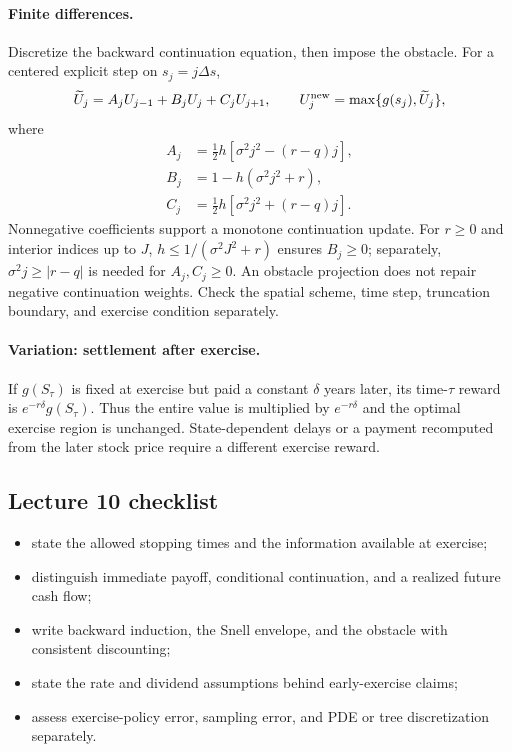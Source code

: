 \paragraph{Finite differences.}
Discretize the backward continuation equation, then impose the obstacle.
For a centered explicit step on \(s_j=j\Delta s\),
\[
\widetilde U_j=A_jU_{j-1}+B_jU_j+C_jU_{j+1},\qquad
U_j^{\rm new}=\max\{g(s_j),\widetilde U_j\},
\]
where
\[
\begin{aligned}
A_j&=\tfrac12h[\sigma^2j^2-(r-q)j],\\
B_j&=1-h(\sigma^2j^2+r),\\
C_j&=\tfrac12h[\sigma^2j^2+(r-q)j].
\end{aligned}
\]
Nonnegative coefficients support a monotone continuation update. For
\(r\geq0\) and interior indices up to \(J\),
\(h\leq1/(\sigma^2J^2+r)\) ensures \(B_j\geq0\); separately,
\(\sigma^2j\geq|r-q|\) is needed for \(A_j,C_j\geq0\).
An obstacle projection does not repair negative continuation weights.
Check the spatial scheme, time step, truncation boundary, and exercise
condition separately.

\paragraph{Variation: settlement after exercise.}
If \(g(S_\tau)\) is fixed at exercise but paid a constant \(\delta\)
years later, its time-\(\tau\) reward is \(e^{-r\delta}g(S_\tau)\).
Thus the entire value is multiplied by \(e^{-r\delta}\) and the
optimal exercise region is unchanged. State-dependent delays or a payment
recomputed from the later stock price require a different exercise reward.

\subsection*{Lecture 10 checklist}
\begin{itemize}[leftmargin=1.5em,itemsep=0.15em]
\item state the allowed stopping times and the information available at exercise;
\item distinguish immediate payoff, conditional continuation, and a realized future cash flow;
\item write backward induction, the Snell envelope, and the obstacle with consistent discounting;
\item state the rate and dividend assumptions behind early-exercise claims;
\item assess exercise-policy error, sampling error, and PDE or tree discretization separately.
\end{itemize}
